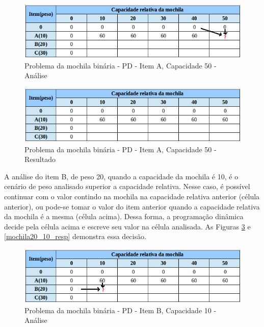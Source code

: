 \FloatBarrier
\begin{figure}[!h]
\centering
\includegraphics[keepaspectratio=true,scale=0.6]{figuras/matriz10_50.png}
\caption{Problema da mochila binária - PD - Item A, Capacidade 50 - Análise}
\label{matriz10_50}
\end{figure}

\FloatBarrier
\begin{figure}[!h]
\centering
\includegraphics[keepaspectratio=true,scale=0.6]{figuras/matriz10_50_resp.png}
\caption{Problema da mochila binária - PD - Item A, Capacidade 50 - Resultado}
\label{matriz10_50_resp}
\end{figure}
 
A análise do item B, de peso 20, quando a capacidade da mochila é 10, é o cenário de peso analisado superior a capacidade relativa. Nesse caso, é possível continuar com o valor contindo na mochila na capacidade relativa anterior (célula anterior), ou pode-se tomar o valor do item anterior quando a capacidade relativa da mochila é a mesma (célula acima). Dessa forma, a programação dinâmica decide pela célula acima e escreve seu valor na célula analisada. As Figuras \ref{matriz20_10} e \ref{mochila20_10_resp} demonstra essa decisão.

\FloatBarrier
\begin{figure}[!h]
\centering
\includegraphics[keepaspectratio=true,scale=0.5]{figuras/matriz20_10.png}
\caption{Problema da mochila binária - PD - Item B, Capacidade 10 - Análise}
\label{matriz20_10}
\end{figure}

